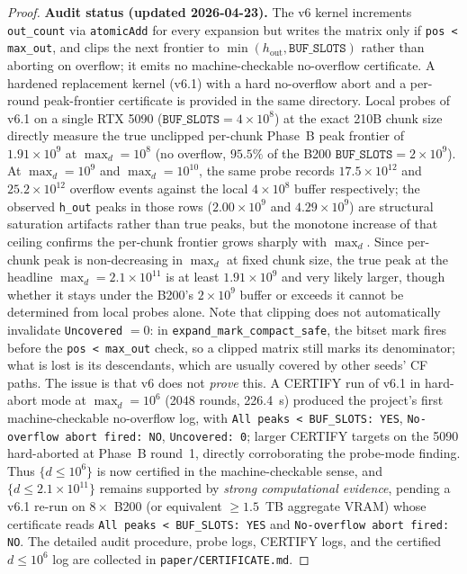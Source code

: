 \documentclass[11pt,a4paper]{amsart}
\theoremstyle{definition}
\begin{document}
\begin{proof}
\textbf{Audit status (updated 2026-04-23).} The v6 kernel increments \texttt{out\_count} via \texttt{atomicAdd} for every expansion but writes the matrix only if \texttt{pos < max\_out}, and clips the next frontier to $\min(h_\text{out}, \texttt{BUF\_SLOTS})$ rather than aborting on overflow; it emits no machine-checkable no-overflow certificate. A hardened replacement kernel (v6.1) with a hard no-overflow abort and a per-round peak-frontier certificate is provided in the same directory. Local probes of v6.1 on a single RTX 5090 ($\texttt{BUF\_SLOTS} = 4 \times 10^8$) at the exact 210B chunk size directly measure the true unclipped per-chunk Phase~B peak frontier of $1.91 \times 10^9$ at $\max_d = 10^8$ (no overflow, $95.5\%$ of the B200 $\texttt{BUF\_SLOTS} = 2 \times 10^9$). At $\max_d = 10^9$ and $\max_d = 10^{10}$, the same probe records $17.5 \times 10^{12}$ and $25.2 \times 10^{12}$ overflow events against the local $4 \times 10^8$ buffer respectively; the observed \texttt{h\_out} peaks in those rows ($2.00 \times 10^9$ and $4.29 \times 10^9$) are structural saturation artifacts rather than true peaks, but the monotone increase of that ceiling confirms the per-chunk frontier grows sharply with $\max_d$. Since per-chunk peak is non-decreasing in $\max_d$ at fixed chunk size, the true peak at the headline $\max_d = 2.1 \times 10^{11}$ is at least $1.91 \times 10^9$ and very likely larger, though whether it stays under the B200's $2 \times 10^9$ buffer or exceeds it cannot be determined from local probes alone. Note that clipping does not automatically invalidate \texttt{Uncovered} $= 0$: in \texttt{expand\_mark\_compact\_safe}, the bitset mark fires before the \texttt{pos < max\_out} check, so a clipped matrix still marks its denominator; what is lost is its descendants, which are usually covered by other seeds' CF paths. The issue is that v6 does not \emph{prove} this. A CERTIFY run of v6.1 in hard-abort mode at $\max_d = 10^6$ (2048 rounds, 226.4~s) produced the project's first machine-checkable no-overflow log, with \texttt{All peaks < BUF\_SLOTS: YES}, \texttt{No-overflow abort fired: NO}, \texttt{Uncovered: 0}; larger CERTIFY targets on the 5090 hard-aborted at Phase~B round~1, directly corroborating the probe-mode finding. Thus $\{d \leq 10^6\}$ is now certified in the machine-checkable sense, and $\{d \leq 2.1 \times 10^{11}\}$ remains supported by \emph{strong computational evidence}, pending a v6.1 re-run on $8\times$ B200 (or equivalent $\geq 1.5$~TB aggregate VRAM) whose certificate reads \texttt{All peaks < BUF\_SLOTS: YES} and \texttt{No-overflow abort fired: NO}. The detailed audit procedure, probe logs, CERTIFY logs, and the certified $d \leq 10^6$ log are collected in \texttt{paper/CERTIFICATE.md}.
\end{proof}
\end{document}
